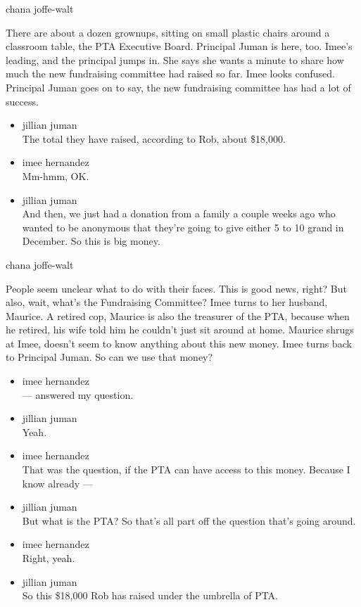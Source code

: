 chana joffe-walt

There are about a dozen grownups, sitting on small plastic chairs around
a classroom table, the PTA Executive Board. Principal Juman is here,
too. Imee's leading, and the principal jumps in. She says she wants a
minute to share how much the new fundraising committee had raised so
far. Imee looks confused. Principal Juman goes on to say, the new
fundraising committee has had a lot of success.

\begin{itemize}
\item
  jillian juman\\
  The total they have raised, according to Rob, about \$18,000.
\item
  imee hernandez\\
  Mm-hmm, OK.
\item
  jillian juman\\
  And then, we just had a donation from a family a couple weeks ago who
  wanted to be anonymous that they're going to give either 5 to 10 grand
  in December. So this is big money.
\end{itemize}

chana joffe-walt

People seem unclear what to do with their faces. This is good news,
right? But also, wait, what's the Fundraising Committee? Imee turns to
her husband, Maurice. A retired cop, Maurice is also the treasurer of
the PTA, because when he retired, his wife told him he couldn't just sit
around at home. Maurice shrugs at Imee, doesn't seem to know anything
about this new money. Imee turns back to Principal Juman. So can we use
that money?

\begin{itemize}
\item
  imee hernandez\\
  --- answered my question.
\item
  jillian juman\\
  Yeah.
\item
  imee hernandez\\
  That was the question, if the PTA can have access to this money.
  Because I know already ---
\item
  jillian juman\\
  But what is the PTA? So that's all part off the question that's going
  around.
\item
  imee hernandez\\
  Right, yeah.
\item
  jillian juman\\
  So this \$18,000 Rob has raised under the umbrella of PTA.
\end{itemize}

